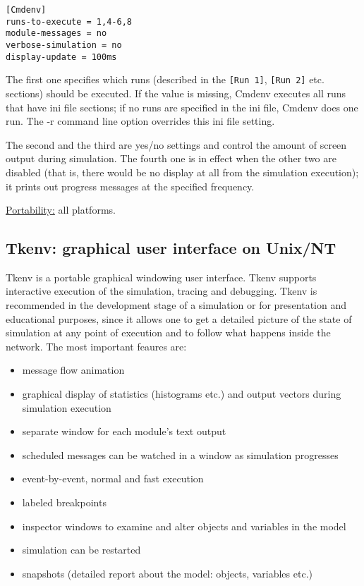 \begin{Verbatim}
[Cmdenv]
runs-to-execute = 1,4-6,8
module-messages = no
verbose-simulation = no
display-update = 100ms
\end{Verbatim}


The first one specifies which runs (described in the \texttt{[Run 1]},
\texttt{[Run 2]} etc. sections) should be executed. If the value is
missing, Cmdenv executes all runs that have ini file sections; if no
runs are specified in the ini file, Cmdenv does one run. The -r
command line option overrides this ini file setting.


The second and the third are yes/no settings and control the 
amount of screen output during simulation. The fourth one is 
in effect when the other two are disabled (that is, there would 
be no display at all from the simulation execution); it prints 
out progress messages at the specified frequency.

{\underline {Portability:}} all platforms.



\subsection{Tkenv: graphical user interface on Unix/NT}



Tkenv is a portable graphical windowing user interface.
Tkenv supports interactive execution of the simulation, tracing and
debugging. Tkenv is recommended in the
development stage of a simulation or for presentation and educational
purposes, since it allows one to get a detailed picture of the state
of simulation at any point of execution and to follow what happens
inside the network. The most important feaures are:
\begin{itemize}
  \item{message flow animation}
  \item{graphical display of statistics (histograms etc.) and output
    vectors during simulation execution}
  \item{separate window for each module's text output}
  \item{scheduled messages can be watched in a window as simulation
    progresses}
  \item{event-by-event, normal and fast execution}
  \item{labeled breakpoints}
  \item{inspector windows to examine and alter objects and variables
    in the model}
  \item{simulation can be restarted}
  \item{snapshots (detailed report about the model: objects, variables
    etc.)}
\end{itemize}


